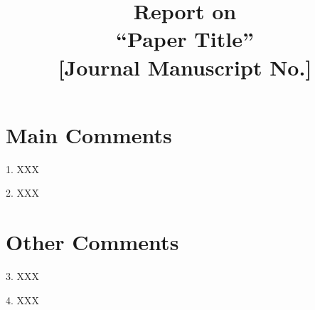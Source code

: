 \documentclass[12pt,draftclsnofoot,onecolumn]{IEEEtran}
\begin{document}
\title{\textbf{Report on }\\
\textbf{``Paper Title''}\\
{[}Journal Manuscript No.{]}}

\author{}
\date{}

\maketitle

\section*{Main Comments}

1. XXX

2. XXX

\section*{Other Comments}

3. XXX

4. XXX
\end{document}
